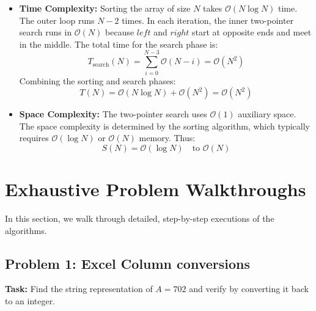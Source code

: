 \documentclass[10pt,journal,compsoc,onecolumn]{IEEEtran}
\begin{document}
\begin{itemize}
    \item \textbf{Time Complexity:}
    Sorting the array of size $N$ takes $\mathcal{O}(N \log N)$ time.
    The outer loop runs $N - 2$ times. In each iteration, the inner two-pointer search runs in $\mathcal{O}(N)$ because $left$ and $right$ start at opposite ends and meet in the middle. The total time for the search phase is:
    \begin{equation}
    T_{\text{search}}(N) = \sum_{i=0}^{N-3} \mathcal{O}(N - i) = \mathcal{O}(N^2)
    \end{equation}
    Combining the sorting and search phases:
    \begin{equation}
    T(N) = \mathcal{O}(N \log N) + \mathcal{O}(N^2) = \mathcal{O}(N^2)
    \end{equation}
    \item \textbf{Space Complexity:} The two-pointer search uses $\mathcal{O}(1)$ auxiliary space. The space complexity is determined by the sorting algorithm, which typically requires $\mathcal{O}(\log N)$ or $\mathcal{O}(N)$ memory. Thus:
    \begin{equation}
    S(N) = \mathcal{O}(\log N) \quad \text{to } \mathcal{O}(N)
    \end{equation}
\end{itemize}

\section{Exhaustive Problem Walkthroughs}
\label{sec:problems}

In this section, we walk through detailed, step-by-step executions of the algorithms.

\subsection{Problem 1: Excel Column conversions}
\textbf{Task:} Find the string representation of $A = 702$ and verify by converting it back to an integer.
\end{document}
